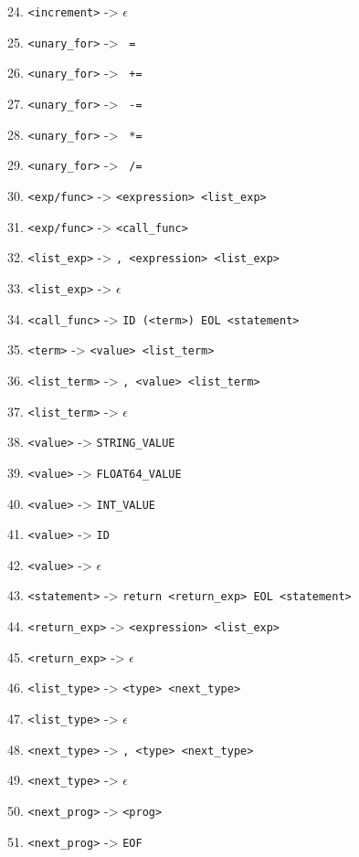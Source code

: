 \documentclass[a4paper, 11pt]{article}
\begin{document}
\begin{flushleft}
	24. \texttt{<increment>} -> \texttt{$\epsilon$}
	
	25. \texttt{<unary\_for>} -> \texttt{ = }

	26. \texttt{<unary\_for>} -> \texttt{ += }

	27. \texttt{<unary\_for>} -> \texttt{ -= }

	28. \texttt{<unary\_for>} -> \texttt{ *= }

	29. \texttt{<unary\_for>} -> \texttt{ /= }

	30. \texttt{<exp/func>} -> \texttt{<expression> <list\_exp>}

	31. \texttt{<exp/func>} -> \texttt{<call\_func>}

	32. \texttt{<list\_exp>} -> \texttt{, <expression> <list\_exp>}

	33. \texttt{<list\_exp>} -> \texttt{$\epsilon$}

	34. \texttt{<call\_func>} -> \texttt{ID (<term>) EOL <statement>}

	35. \texttt{<term>} -> \texttt{<value> <list\_term>}

	36. \texttt{<list\_term>} -> \texttt{, <value> <list\_term>}

	37. \texttt{<list\_term>} -> \texttt{$\epsilon$}

	38. \texttt{<value>} -> \texttt{STRING\_VALUE}

	39. \texttt{<value>} -> \texttt{FLOAT64\_VALUE}

	40. \texttt{<value>} -> \texttt{INT\_VALUE}

	41. \texttt{<value>} -> \texttt{ID}

	42. \texttt{<value>} -> \texttt{$\epsilon$}

	43. \texttt{<statement>} -> \texttt{return <return\_exp> EOL <statement>}

	44. \texttt{<return\_exp>} -> \texttt{<expression> <list\_exp>}

	45. \texttt{<return\_exp>} -> \texttt{$\epsilon$}

	46. \texttt{<list\_type>} -> \texttt{<type> <next\_type>}

	47. \texttt{<list\_type>} -> \texttt{$\epsilon$}

	48. \texttt{<next\_type>} -> \texttt{, <type> <next\_type>}

	49. \texttt{<next\_type>} -> \texttt{$\epsilon$}

	50. \texttt{<next\_prog>} -> \texttt{<prog>}

	51. \texttt{<next\_prog>} -> \texttt{EOF}


\end{flushleft}
\end{document}
